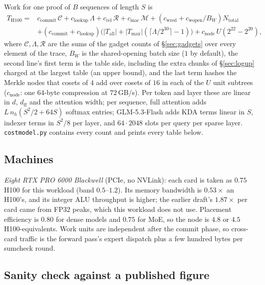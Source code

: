 \documentclass[11pt]{article}
\begin{document}
Work for one proof of \(B\) sequences of length \(S\) is
\begin{align*}
T_{\mathrm{H100}} = {} & c_{\mathrm{commit}}\, \mathcal{C} + c_{\mathrm{lookup}}\, \Lambda + c_{\mathrm{rel}}\, \mathcal{R} + c_{\mathrm{mac}}\, \mathcal{M} + (c_{\mathrm{wred}} + c_{\mathrm{wopen}}/B_W) N_{\mathrm{total}} \\
& + (c_{\mathrm{commit}} + c_{\mathrm{lookup}})\big(|T_{\mathrm{all}}| + |T_{\max}| (\lceil \Lambda / 2^{30} \rceil - 1)\big) + c_{\mathrm{node}}\, U (2^{22} - 2^{20}),
\end{align*}
where \(\mathcal{C}, \Lambda, \mathcal{R}\) are the sums of the gadget counts of \S\ref{sec:gadgets} over every element of the trace, \(B_W\) is the shared-opening batch size (\(1\) by default), the second line's first term is the table side, including the extra chunks of \S\ref{sec:logup} charged at the largest table (an upper bound), and the last term hashes the Merkle nodes that cosets of \(4\) add over cosets of \(16\) in each of the \(U\) unit subtrees (\(c_{\mathrm{node}}\): one \(64\)-byte compression at \(72\)\,GB/s).
Per token and layer these are linear in \(d\), \(d_{\mathrm{ff}}\) and the attention width; per sequence, full attention adds \(L\, n_h (S^2/2 + 64S)\) softmax entries; GLM-5.3-Flash adds KDA terms linear in \(S\), indexer terms in \(S^2/8\) per layer, and \(64\cdot 2048\) slots per query per sparse layer.
\texttt{costmodel.py} contains every count and prints every table below.

\subsection{Machines}

\emph{Eight RTX PRO 6000 Blackwell} (PCIe, no NVLink): each card is taken as \(0.75\) H100 for this workload (band \(0.5\)--\(1.2\)).
Its memory bandwidth is \(0.53\times\) an H100's, and its integer ALU throughput is higher; the earlier draft's \(1.87\times\) per card came from FP32 peaks, which this workload does not use.
Placement efficiency is \(0.80\) for dense models and \(0.75\) for MoE, so the node is \(4.8\) or \(4.5\) H100-equivalents.
Work units are independent after the commit phase, so cross-card traffic is the forward pass's expert dispatch plus a few hundred bytes per sumcheck round.

\subsection{Sanity check against a published figure}
\end{document}
